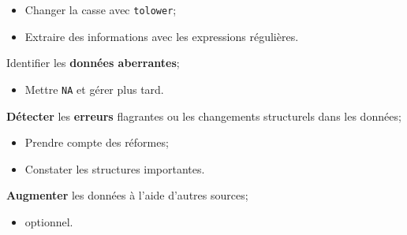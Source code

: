 \documentclass[10pt, french]{article}
\begin{document}
\begin{multicols*}{3}
\begin{algo2}
\begin{todolist}[leftmargin = *]
\begin{itemize}[leftmargin = *]
		\item	Changer la casse avec \texttt{tolower};
		\item	Extraire des informations avec les expressions régulières.
		\end{itemize}
	\item	Identifier les \textbf{données aberrantes};
		\begin{itemize}[leftmargin = *]
		\item	Mettre \texttt{NA} et gérer plus tard.
		\end{itemize}
	\item	\textbf{Détecter} les \textbf{erreurs} flagrantes ou les changements structurels dans les données;
		\begin{itemize}[leftmargin = *]
		\item	Prendre compte des réformes;
		\item	Constater les structures importantes.
		\end{itemize}
	\item	\textbf{Augmenter} les données à l'aide d'autres sources;
		\begin{itemize}[leftmargin = *]
		\item	optionnel.
		\end{itemize}
\end{todolist}
\end{algo2}


\end{multicols*}
\end{document}
